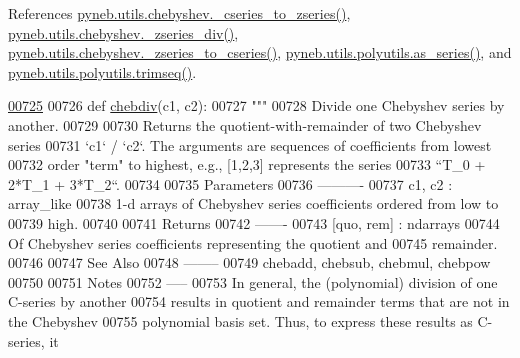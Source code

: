 References \hyperlink{chebyshev_8py_source_l00100}{pyneb.\-utils.\-chebyshev.\-\_\-cseries\-\_\-to\-\_\-zseries()}, \hyperlink{chebyshev_8py_source_l00174}{pyneb.\-utils.\-chebyshev.\-\_\-zseries\-\_\-div()}, \hyperlink{chebyshev_8py_source_l00124}{pyneb.\-utils.\-chebyshev.\-\_\-zseries\-\_\-to\-\_\-cseries()}, \hyperlink{polyutils_8py_source_l00115}{pyneb.\-utils.\-polyutils.\-as\-\_\-series()}, and \hyperlink{polyutils_8py_source_l00085}{pyneb.\-utils.\-polyutils.\-trimseq()}.


\begin{DoxyCode}
\hypertarget{namespacepyneb_1_1utils_1_1chebyshev_l00725}{}\hyperlink{namespacepyneb_1_1utils_1_1chebyshev_a5d4faaef412d6dfe502716e8e287d727}{00725} 
00726 \textcolor{keyword}{def }\hyperlink{namespacepyneb_1_1utils_1_1chebyshev_a5d4faaef412d6dfe502716e8e287d727}{chebdiv}(c1, c2):
00727     \textcolor{stringliteral}{"""}
00728 \textcolor{stringliteral}{    Divide one Chebyshev series by another.}
00729 \textcolor{stringliteral}{}
00730 \textcolor{stringliteral}{    Returns the quotient-with-remainder of two Chebyshev series}
00731 \textcolor{stringliteral}{    `c1` / `c2`.  The arguments are sequences of coefficients from lowest}
00732 \textcolor{stringliteral}{    order "term" to highest, e.g., [1,2,3] represents the series}
00733 \textcolor{stringliteral}{    ``T\_0 + 2*T\_1 + 3*T\_2``.}
00734 \textcolor{stringliteral}{}
00735 \textcolor{stringliteral}{    Parameters}
00736 \textcolor{stringliteral}{    ----------}
00737 \textcolor{stringliteral}{    c1, c2 : array\_like}
00738 \textcolor{stringliteral}{        1-d arrays of Chebyshev series coefficients ordered from low to}
00739 \textcolor{stringliteral}{        high.}
00740 \textcolor{stringliteral}{}
00741 \textcolor{stringliteral}{    Returns}
00742 \textcolor{stringliteral}{    -------}
00743 \textcolor{stringliteral}{    [quo, rem] : ndarrays}
00744 \textcolor{stringliteral}{        Of Chebyshev series coefficients representing the quotient and}
00745 \textcolor{stringliteral}{        remainder.}
00746 \textcolor{stringliteral}{}
00747 \textcolor{stringliteral}{    See Also}
00748 \textcolor{stringliteral}{    --------}
00749 \textcolor{stringliteral}{    chebadd, chebsub, chebmul, chebpow}
00750 \textcolor{stringliteral}{}
00751 \textcolor{stringliteral}{    Notes}
00752 \textcolor{stringliteral}{    -----}
00753 \textcolor{stringliteral}{    In general, the (polynomial) division of one C-series by another}
00754 \textcolor{stringliteral}{    results in quotient and remainder terms that are not in the Chebyshev}
00755 \textcolor{stringliteral}{    polynomial basis set.  Thus, to express these results as C-series, it}

\end{DoxyCode}
